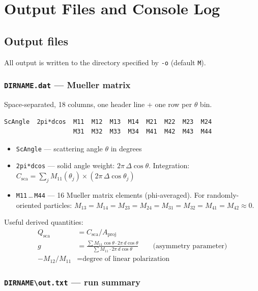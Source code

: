 \documentclass[11pt,a4paper]{article}
\begin{document}
\section{Output Files and Console Log}

\subsection{Output files}

All output is written to the directory specified by \texttt{-o} (default \texttt{M}).

\subsubsection{\texttt{DIRNAME.dat} --- Mueller matrix}

Space-separated, 18 columns, one header line + one row per $\theta$ bin.

\begin{lstlisting}[basicstyle=\ttfamily\scriptsize]
ScAngle  2pi*dcos  M11  M12  M13  M14  M21  M22  M23  M24
                   M31  M32  M33  M34  M41  M42  M43  M44
\end{lstlisting}

\begin{itemize}
\item \texttt{ScAngle} --- scattering angle $\theta$ in degrees
\item \texttt{2pi*dcos} --- solid angle weight: $2\pi\,\Delta\cos\theta$.
  Integration: $C_\text{sca} = \sum_j M_{11}(\theta_j) \times (2\pi\,\Delta\cos\theta_j)$
\item \texttt{M11}\,\ldots\,\texttt{M44} --- 16 Mueller matrix elements (phi-averaged).
  For randomly-oriented particles: $M_{13}=M_{14}=M_{23}=M_{24}=M_{31}=M_{32}=M_{41}=M_{42}\approx 0$.
\end{itemize}

Useful derived quantities:
\begin{align*}
Q_\text{sca} &= C_\text{sca} / A_\text{proj} \\
g &= \frac{\sum M_{11}\cos\theta \cdot 2\pi\,d\cos\theta}{\sum M_{11}\cdot 2\pi\,d\cos\theta}
\qquad\text{(asymmetry parameter)} \\
-M_{12}/M_{11} &= \text{degree of linear polarization}
\end{align*}

\subsubsection{\texttt{DIRNAME\textbackslash out.txt} --- run summary}
\end{document}
